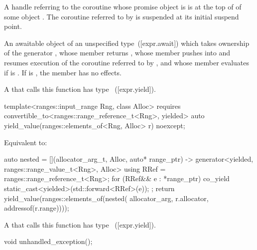 \documentclass{wg21}
\begin{document}
\begin{addedblock}
\begin{itemdescr}
\expects
A handle referring to the coroutine whose promise object is 
is at the top of 
of some  object .
The coroutine referred to by 
is suspended at its initial suspend point.

\returns
An awaitable object of an unspecified type~([expr.await])
which takes ownership of the generator ,
whose member  returns ,
whose member 
pushes 
into 
and resumes execution of the coroutine referred to
by , and
whose member  evaluates
if  is .
If  is ,
the  member has no effects.

\remarks
A  that calls this function
has type ~([expr.yield]).
\end{itemdescr}

\begin{itemdecl}
template<ranges::input_range Rng, class Alloc>
  requires convertible_to<ranges::range_reference_t<Rng>, yielded>
    auto yield_value(ranges::elements_of<Rng, Alloc> r) noexcept;
\end{itemdecl}

\begin{itemdescr}
\effects
Equivalent to:
\begin{codeblock}
    auto nested = [](allocator_arg_t, Alloc, auto* range_ptr)
      -> generator<yielded, ranges::range_value_t<Rng>, Alloc> {
        using RRef = ranges::range_reference_t<Rng>;
        for (RRef&& e : *range_ptr)
          co_yield static_cast<yielded>(std::forward<RRef>(e));
      };
    return yield_value(ranges::elements_of(nested(
      allocator_arg, r.allocator, addressof(r.range))));
\end{codeblock}

\remarks
A  that calls this function
has type ~([expr.yield]).
\end{itemdescr}

\begin{itemdecl}
void unhandled_exception();
\end{itemdecl}


\end{addedblock}
\end{document}
